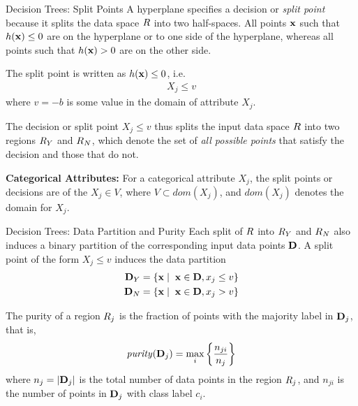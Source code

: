 \begin{frame}{Decision Trees: Split Points} 
A hyperplane specif\/{i}es a decision or {\em
split point} because it splits the data space ${\relax R}$ into two
half-spaces. All points $\mathbf{x}$ such that $h(\mathbf{x}) \le 0$ are on the
hyperplane or to one side of the hyperplane, whereas all points
such that $h(\mathbf{x}) > 0$ are on the other side. 

\medskip
The split point is written as $h(\mathbf{x}) \le 0$, i.e.
\begin{align*}
  X_{j} \le v
\end{align*}
where $v = -b$ is some value in the domain of attribute $X_{j}$. 

\medskip
The
decision or split point $X_{j} \le v$ thus splits the input data
space ${\relax R}$ into two regions ${\relax R}_Y$ and ${\relax R}_N$, which denote the
set of {\em all possible points} that satisfy the decision and
those that do not.

\bigskip
{\bf Categorical Attributes:}
 For a categorical attribute $X_{j}$, the split points or
decisions are of the $X_{j} \in V$, where $V \subset dom(X_{j})$, and
$dom(X_{j})$ denotes the domain for $X_{j}$. 

\end{frame}



\begin{frame}{Decision Trees: Data Partition and Purity}
Each split of ${\relax R}$ into
${\relax R}_Y$ and ${\relax R}_N$ also induces a binary partition of the
corresponding input data points $\mathbf{D}$. A split point of
the form $X_{j} \le v$ induces the data partition
\begin{align*}
  \mathbf{D}_Y & = \{\mathbf{x} \mid \; \mathbf{x} \in \mathbf{D}, x_{j} \le v\}\\
  \mathbf{D}_N & = \{\mathbf{x} \mid \; \mathbf{x} \in \mathbf{D}, x_{j} > v\}
\end{align*}

\bigskip
The purity of a region ${\relax R}_{j}$ is the
fraction of points with the majority label in $\mathbf{D}_{j}$, that is,
\begin{align*}
  \mathit{purity}(\mathbf{D}_{j}) = \max_i \left\{ {n_{ji} \over n_{j}} \right \}
\end{align*}
where $n_{j}=|\mathbf{D}_{j}|$ is the total number of data points in the
region ${\relax R}_{j}$, and $n_{ji}$ is the number of points in $\mathbf{D}_{j}$
with class label $c_i$.
\end{frame}




